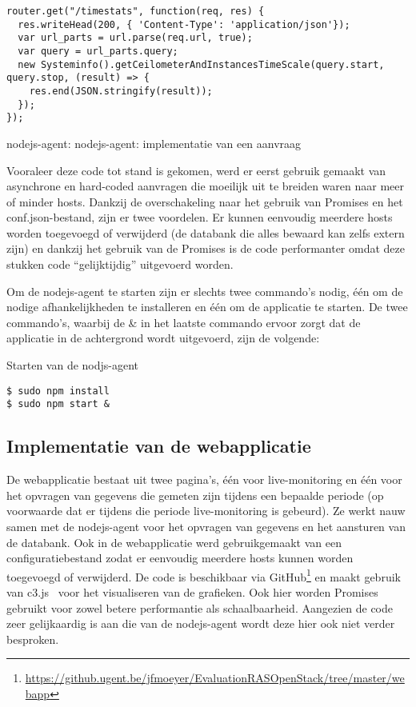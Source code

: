 \begin{code}
\begin{verbatim}
router.get("/timestats", function(req, res) {
  res.writeHead(200, { 'Content-Type': 'application/json'});
  var url_parts = url.parse(req.url, true);
  var query = url_parts.query;
  new Systeminfo().getCeilometerAndInstancesTimeScale(query.start, query.stop, (result) => {
    res.end(JSON.stringify(result));
  });
});
\end{verbatim}
\caption{nodejs-agent: nodejs-agent: implementatie van een aanvraag}
\end{code}

Vooraleer deze code tot stand is gekomen, werd er eerst gebruik gemaakt van asynchrone en hard-coded aanvragen die moeilijk uit te breiden waren naar meer of minder hosts. Dankzij de overschakeling naar het gebruik van Promises en het conf.json-bestand, zijn er twee voordelen. Er kunnen eenvoudig meerdere hosts worden toegevoegd of verwijderd (de databank die alles bewaard kan zelfs extern zijn) en dankzij het gebruik van de Promises is de code performanter omdat deze stukken code ``gelijktijdig'' uitgevoerd worden.

Om de nodejs-agent te starten zijn er slechts twee commando's nodig, één om de nodige afhankelijkheden te installeren en één om de applicatie te starten. De twee commando's, waarbij de \& in het laatste commando ervoor zorgt dat de applicatie in de achtergrond wordt uitgevoerd, zijn de volgende:

\begin{code}
\caption{Starten van de nodjs-agent}
\begin{verbatim}
$ sudo npm install
$ sudo npm start &
\end{verbatim}
\end{code}

\subsection{Implementatie van de webapplicatie}

De webapplicatie bestaat uit twee pagina's, één voor live-monitoring en één voor het opvragen van gegevens die gemeten zijn tijdens een bepaalde periode (op voorwaarde dat er tijdens die periode live-monitoring is gebeurd). Ze werkt nauw samen met de nodejs-agent voor het opvragen van gegevens en het aansturen van de databank. Ook in de webapplicatie werd gebruikgemaakt van een configuratiebestand zodat er eenvoudig meerdere hosts kunnen worden toegevoegd of verwijderd. De code is beschikbaar via GitHub\footnote{\url{https://github.ugent.be/jfmoeyer/EvaluationRASOpenStack/tree/master/webapp}} en maakt gebruik van c3.js~\cite{Tanaka2014} voor het visualiseren van de grafieken. Ook hier worden Promises gebruikt voor zowel betere performantie als schaalbaarheid. Aangezien de code zeer gelijkaardig is aan die van de nodejs-agent wordt deze hier ook niet verder besproken.

